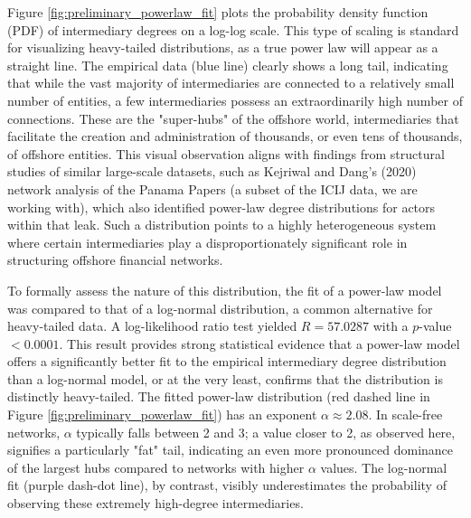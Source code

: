 Figure \ref{fig:preliminary_powerlaw_fit} plots the probability density function (PDF) of intermediary degrees on a log-log scale. This type of scaling is standard for visualizing heavy-tailed distributions, as a true power law will appear as a straight line. The empirical data (blue line) clearly shows a long tail, indicating that while the vast majority of intermediaries are connected to a relatively small number of entities, a few intermediaries possess an extraordinarily high number of connections. These are the "super-hubs" of the offshore world, intermediaries that facilitate the creation and administration of thousands, or even tens of thousands, of offshore entities. This visual observation aligns with findings from structural studies of similar large-scale datasets, such as Kejriwal and Dang's (2020) network analysis of the Panama Papers (a subset of the ICIJ data, we are working with), which also identified power-law degree distributions for actors within that leak. Such a distribution points to a highly heterogeneous system where certain intermediaries play a disproportionately significant role in structuring offshore financial networks.

To formally assess the nature of this distribution, the fit of a power-law model was compared to that of a log-normal distribution, a common alternative for heavy-tailed data. A log-likelihood ratio test yielded $R = 57.0287$ with a $p$-value $< 0.0001$. This result provides strong statistical evidence that a power-law model offers a significantly better fit to the empirical intermediary degree distribution than a log-normal model, or at the very least, confirms that the distribution is distinctly heavy-tailed. The fitted power-law distribution (red dashed line in Figure \ref{fig:preliminary_powerlaw_fit}) has an exponent $\alpha \approx 2.08$. In scale-free networks, $\alpha$ typically falls between 2 and 3; a value closer to 2, as observed here, signifies a particularly "fat" tail, indicating an even more pronounced dominance of the largest hubs compared to networks with higher $\alpha$ values. The log-normal fit (purple dash-dot line), by contrast, visibly underestimates the probability of observing these extremely high-degree intermediaries.

